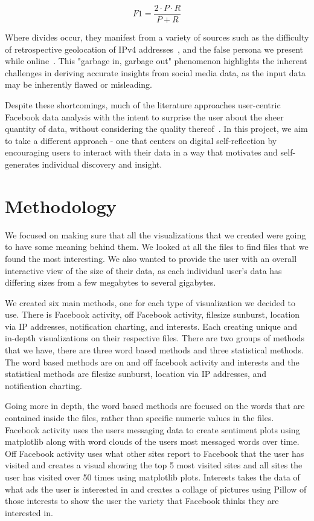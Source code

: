 \documentclass[conference, letterpaper, 11pt]{IEEEtran}
\begin{document}
\begin{equation}
    F1 = \frac{2 \cdot P \cdot R}{P + R}\label{eqn:f1}
\end{equation}

Where divides occur, they manifest from a variety of sources such as the difficulty of retrospective geolocation of IPv4 addresses~\cite{ipgeo}, and the false persona we present while online~\cite{fbself}. This "garbage in, garbage out" phenomenon highlights the inherent challenges in deriving accurate insights from social media data, as the input data may be inherently flawed or misleading.

Despite these shortcomings, much of the literature approaches user-centric Facebook data analysis with the intent to surprise the user about the sheer quantity of data, without considering the quality thereof~\cite{surpriv, usercontext}. In this project, we aim to take a different approach - one that centers on digital self-reflection by encouraging users to interact with their data in a way that motivates and self-generates individual discovery and insight.

\section{Methodology} \label{ME}
We focused on making sure that all the visualizations that we created were going to have some meaning behind them. We looked at all the files to find files that we found the most interesting. We also wanted to provide the user with an overall interactive view of the size of their data, as each individual user's data has differing sizes from a few megabytes to several gigabytes.

We created six main methods, one for each type of visualization we decided to use. There is Facebook activity, off Facebook activity, filesize sunburst, location via IP addresses, notification charting, and interests. Each creating unique and in-depth visualizations on their respective files. There are two groups of methods that we have, there are three word based methods and three statistical methods. The word based methods are on and off facebook activity and interests and the statistical methods are filesize sunburst, location via IP addresses, and notification charting. 

Going more in depth, the word based methods are focused on the words that are contained inside the files, rather than specific numeric values in the files. Facebook activity uses the users messaging data to create sentiment plots using matplotlib along with word clouds of the users most messaged words over time. Off Facebook activity uses what other sites report to Facebook that the user has visited and creates a visual showing the top 5 most visited sites and all sites the user has visited over 50 times using matplotlib plots. Interests takes the data of what ads the user is interested in and creates a collage of pictures using Pillow of those interests to show the user the variety that Facebook thinks they are interested in.
\end{document}
